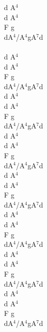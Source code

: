 \documentclass[a5paper, 10pt]{book}
\begin{document}
\begin{minipage}[t]{0.15\textwidth}
  d A$^4$\\
  d A$^4$\\
  F g\\
  dA$^4$/A$^4$gA$^7$d\\
  \\
  d A$^4$\\
  d A$^4$\\
  F g\\
  dA$^4$/A$^4$gA$^7$d\\

  d A$^4$\\
  d A$^4$\\
  F g\\
  dA$^4$/A$^4$gA$^7$d\\

  d A$^4$\\
  d A$^4$\\
  F g\\
  dA$^4$/A$^4$gA$^7$d\\

  d A$^4$\\
  d A$^4$\\
  F g\\
  dA$^4$/A$^4$gA$^7$d\\

  d A$^4$\\
  d A$^4$\\
  F g\\
  dA$^4$/A$^4$gA$^7$d\\

  d A$^4$\\
  d A$^4$\\
  F g\\
  dA$^4$/A$^4$gA$^7$d\\

  d A$^4$\\
  d A$^4$\\
  F g\\
  dA$^4$/A$^4$gA$^7$d\\
\end{minipage}
\end{document}
